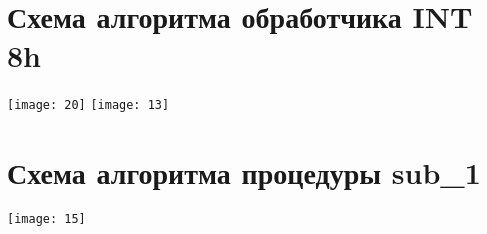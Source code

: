 \section*{Схема алгоритма обработчика INT 8h}
\begin{center}
    \texttt{[image: 20]}
    \clearpage
    \texttt{[image: 13]}
\end{center}
\section*{Схема алгоритма процедуры sub\_1}
\begin{center}
    \texttt{[image: 15]}
\end{center}
